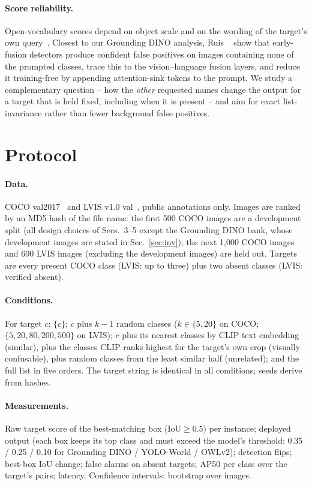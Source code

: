 \documentclass[10pt,twocolumn,letterpaper]{article}
\begin{document}
\paragraph{Score reliability.} Open-vocabulary scores depend on object scale and on the wording of the target's own
query~\cite{scalesem}. Closest to our Grounding DINO analysis, Ruis \etal~\cite{tractordogs} show that early-fusion
detectors produce confident false positives on images containing none of the prompted classes, trace this to the
vision--language fusion layers, and reduce it training-free by appending attention-sink tokens to the prompt. We study
a complementary question -- how the \emph{other} requested names change the output for a target that is held fixed,
including when it is present -- and aim for exact list-invariance rather than fewer background false positives.

\section{Protocol}
\paragraph{Data.} COCO val2017~\cite{coco} and LVIS v1.0 val~\cite{lvis}, public annotations only. Images are ranked by an
MD5 hash of the file name: the first 500 COCO images are a development split (all design choices of Secs.~3--5 except the Grounding DINO bank, whose
development images are stated in Sec.~\ref{sec:inv}); the next 1{,}000
COCO images and 600 LVIS images (excluding the development images) are held out. Targets are every present COCO class
(LVIS: up to three) plus two absent classes (LVIS: verified absent).
\paragraph{Conditions.} For target $c$: $\{c\}$; $c$ plus $k{-}1$ random classes ($k\in\{5,20\}$ on COCO;
$\{5,20,80,200,500\}$ on LVIS); $c$ plus its nearest classes by CLIP text embedding (similar), plus the classes CLIP ranks
highest for the target's own crop (visually confusable), plus random classes from the least similar half (unrelated);
and the full list in five orders. The target string is identical in all conditions; seeds derive from hashes.
\paragraph{Measurements.} Raw target score of the best-matching box (IoU$\ge$0.5) per instance; deployed output
(each box keeps its top class and must exceed the model's threshold: 0.35 / 0.25 / 0.10 for Grounding DINO / YOLO-World
/ OWLv2); detection flips; best-box IoU change; false alarms on absent targets; AP50 per class over the target's pairs;
latency. Confidence intervals: bootstrap over images.
\end{document}
